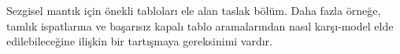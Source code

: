 


\begin{editorial}
  Sezgisel mantık için önekli tabloları ele alan taslak bölüm. Daha fazla
  örneğe, tamlık ispatlarına ve başarısız kapalı tablo aramalarından nasıl
  karşı-model elde edilebileceğine ilişkin bir tartışmaya gereksinimi vardır.
\end{editorial}


\OLEndChapterHook

